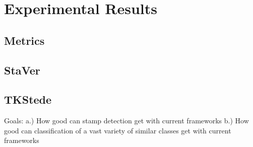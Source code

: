 \chapter{Experimental Results}
\blindtext[1]
\section{Metrics}
\blindtext[2]

\section{StaVer}
\blindtext[7]

\section{TKStede}
\blindtext[7]
Goals: 
    a.) How good can stamp detection get with current frameworks
    b.) How good can classification of a vast variety of similar classes get
        with current frameworks